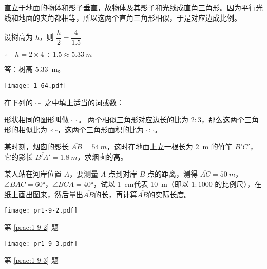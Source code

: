 \noindent
\begin{minipage}{0.5\linewidth}
	\begin{solution}
		直立于地面的物体和影子垂直，故物体及其影子和光线成直角三角形。因为平行光线和地面的夹角都相等，所以这两个直角三角形相似，于是对应边成比例。
		
		设树高为 $h$，则 $\dfrac{h}{2}=\dfrac{4}{1.5}$
		
		\medskip$\therefore\quad h=2\times4\div 1.5\approx \qty{5.33}{m}$
		
		答：树高 \qty{5.33}{m}。
	\end{solution}
\end{minipage}%
\begin{minipage}{0.5\linewidth}\centering
	\texttt{[image: 1-64.pdf]}
	\label{fig:1-64}
\end{minipage}

\begin{Practice}
\begin{question}
	\item 在下列的 $\square \square \square $ 之中填上适当的词或数：
	\begin{tasks}
		\task 形状相同的图形叫做 $\square \square \square $。
		\task 两个相似三角形对应边长的比为 $2:3$，那么这两个三角形的相似比为 $\square : \square $，这两个三角形面积的比为 $\square : \square $。
	\end{tasks}
	\item\label{prac:1-9-2} 某时刻，烟囱的影长 $\overline{AB}=\qty{54}{m}$，这时在地面上立一根长为 \qty{2}{m} 的竹竿 $\overline{B'C'}$，它的影长 $\overline{B'A'}=\qty{1.8}{m}$，求烟囱的高。
	\item\label{prac:1-9-3} 某人站在河岸位置 $A$，要测量 $A$ 点到对岸 $B$ 点的距离，测得 $\overline{AC}=\qty{50}{m}$，$\angle BAC=\ang{60}$，$\angle BCA=\ang{40}$，试以 \qty{1}{cm}代表 \qty{10}{m}（即以 $1:1000$ 的比例尺），在纸上画出图来，然后量出$\overline{AB}$的长，再计算$\overline{AB}$的实际长度。
	\begin{figurehere}
		\begin{minipage}[b]{0.48\linewidth}
			\centering
			\texttt{[image: pr1-9-2.pdf]}
			\caption*{第 \ref{prac:1-9-2} 题}
		\end{minipage}
		\begin{minipage}[b]{0.48\linewidth}
			\centering
			\texttt{[image: pr1-9-3.pdf]}
			\caption*{第 \ref{prac:1-9-3} 题}
		\end{minipage}
	\end{figurehere}
\end{question}
\end{Practice}


